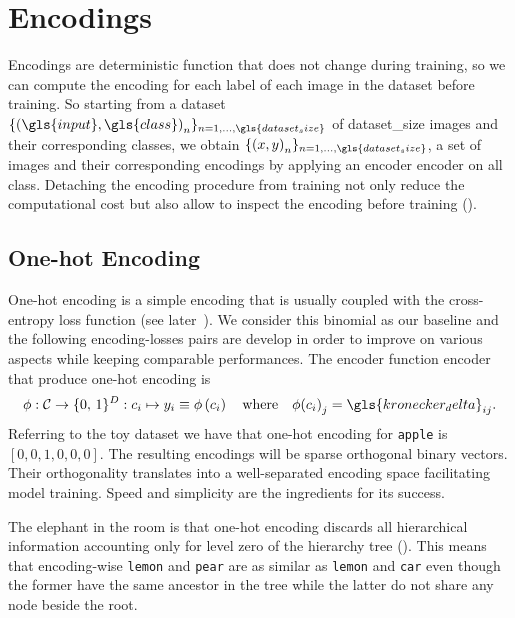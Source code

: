 \section{Encodings}
\label{sec:encodings}

Encodings are deterministic function that does not change during training, so we can compute the encoding for each label of each image in the dataset before training. So starting from a dataset $\{ \left(\gls{input}, \gls{class}\right)_n \}_{n = 1, \ldots, \gls{dataset_size}}$ of \gls{dataset_size} images and their corresponding classes, we obtain $\{ \left(x, y\right)_n \}_{n = 1, \ldots, \gls{dataset_size}}$, a set of images and their corresponding encodings by applying an encoder \gls{encoder} on all \gls{class}.
Detaching the encoding procedure from training not only reduce the computational cost but also allow to inspect the encoding before training ().

\subsection{One-hot Encoding}
\label{subsec:one-hot-encoding}

One-hot encoding is a simple encoding that is usually coupled with the cross-entropy loss function (see later~). We consider this binomial as our baseline and the following encoding-losses pairs are develop in order to improve on various aspects while keeping comparable performances.
The encoder function \gls{encoder} that produce one-hot encoding is
\begin{equation}
  \phi: \mathcal{C} \to \{0, \,1\}^{D}
      : c_i \mapsto y_i \equiv \phi \left(c_i\right)
  \quad \text{where} \quad
  \phi{\left(c_i\right)}_j = \gls{kronecker_delta}_{ij}.
  \label{eq:one-hot-encoding}
\end{equation}
Referring to the toy dataset we have that one-hot encoding for \texttt{apple} is $\left[0, 0, 1, 0, 0, 0\right]$. The resulting encodings will be sparse orthogonal binary vectors. Their orthogonality translates into a well-separated encoding space facilitating model training. Speed and simplicity are the ingredients for its success.

The elephant in the room is that one-hot encoding discards all hierarchical information accounting only for level zero of the hierarchy tree (). This means that encoding-wise \texttt{lemon} and \texttt{pear} are as similar as \texttt{lemon} and \texttt{car} even though the former have the same ancestor in the tree while the latter do not share any node beside the root.

